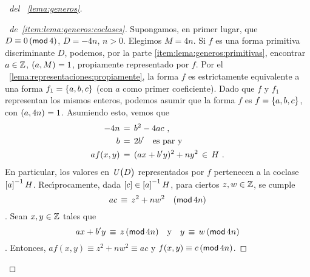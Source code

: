 \begin{proof}[\proofname~del \lemaname~\ref{lema:generos}]
	\begin{proof}[\proofname~de~\ref{item:lema:generos:coclases}]
		Supongamos, en primer lugar, que $D\equiv 0\tmodulo[4]$,
		$D=-4n$, $n>0$. Elegimos $M=4n$. Si $f$ es una forma
		primitiva discriminante $D$, podemos, por la parte
		\ref{item:lema:generos:primitivas}, encontrar $a\in\Enteros$,
		$\mcd{a,M}=1$, propiamente representado por $f$.
		Por el \lemaname~\ref{lema:representaciones:propiamente},
		la forma $f$ es estrictamente equivalente a una forma
		$f_1=\binaria{a,b,c}$ (con $a$ como primer coeficiente).
		Dado que $f$ y $f_1$ representan los mismos enteros,
		podemos asumir que la forma $f$ es $f=\binaria{a,b,c}$,
		con $\mcd{a,4n}=1$. Asumiendo esto, vemos que
		\begin{displaymath}
			\begin{aligned}
				-4n & \,=\,b^2-4ac \dispcomma \\
				b & \,=\,2b' \quad\text{es par y} \\
				af(x,y) & \,=\,(ax+b'y)^2+ny^2
				\,\in\,H
				\dispstop
			\end{aligned}
		\end{displaymath}
		En particular, los valores en $\Unidadesmod[D]$ representados
		por $f$ pertenecen a la coclase $\clase a^{-1}H$.
		Rec\'{\i}procamente, dada $\clase c\in\clase a^{-1}H$,
		para ciertos $z,w\in\Enteros$, se cumple
		\begin{displaymath}
			ac\,\equiv\,z^2+nw^2\modulo[4n]
		\end{displaymath}
		\quedacomoejercicio.
		Sean $x,y\in\Enteros$ tales que
		\begin{displaymath}
			ax+b'y\,\equiv\,z\tmodulo[4n]
			\dispand
			y\,\equiv\,w\tmodulo[4n]
		\end{displaymath}
		\quedacomoejercicio.
		Entonces, $af(x,y)\equiv z^2+nw^2\equiv ac$ y
		$f(x,y)\equiv c\tmodulo[4n]$.


\end{proof}
\end{proof}
